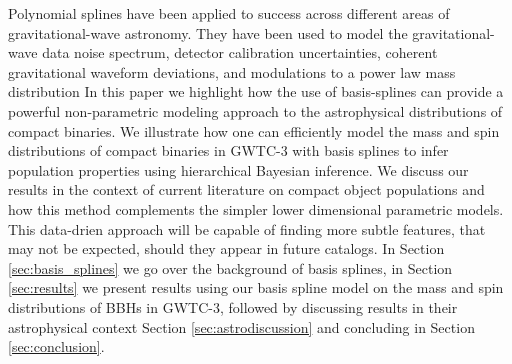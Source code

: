Polynomial splines have been applied to success across different areas of gravitational-wave astronomy. They have been used to model the gravitational-wave data noise spectrum, 
detector calibration uncertainties, coherent gravitational waveform deviations, and modulations to a power law mass distribution \cite{Littenberg_2015,Edwards_2018,B_Farr_etal_2014,Edelman_2021,Edelman_2022ApJ}
In this paper we highlight how the use of basis-splines can provide a powerful non-parametric modeling approach to the astrophysical distributions of compact 
binaries. We illustrate how one can efficiently model the mass and spin distributions of compact binaries in GWTC-3 with basis splines to infer population properties using 
hierarchical Bayesian inference. We discuss our results in the context of current literature on compact object populations and how this method complements the simpler lower dimensional parametric models. 
This data-drien approach will be capable of finding more subtle features, that may not be expected, should they appear in future catalogs. 
In Section \ref{sec:basis_splines} we go over the background of basis splines, in Section \ref{sec:results} we present results using our basis 
spline model on the mass and spin distributions of BBHs in GWTC-3, followed by discussing results in their astrophysical context Section \ref{sec:astrodiscussion} 
and concluding in Section \ref{sec:conclusion}.
